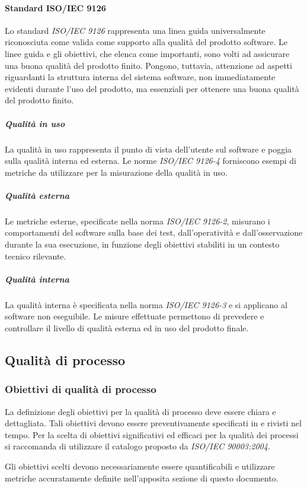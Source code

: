 \documentclass[12pt,a4paper]{article}
\begin{document}
	\paragraph{Standard ISO/IEC 9126}
	Lo standard \textit{ISO/IEC 9126} rappresenta una linea guida universalmente riconosciuta come valida come supporto alla qualità del prodotto software. Le linee guida e gli obiettivi, che elenca come importanti, sono volti ad assicurare una buona qualità del prodotto finito. Pongono, tuttavia, attenzione ad aspetti riguardanti la struttura interna del sistema software, non immediatamente evidenti durante l'uso del prodotto, ma essenziali per ottenere una buona qualità del prodotto finito.
	
	\subparagraph{Qualità in uso}
	La qualità in uso rappresenta il punto di vista dell'utente sul software e poggia sulla qualità interna ed esterna. Le norme \textit{ISO/IEC 9126-4} forniscono esempi di metriche da utilizzare per la misurazione della qualità in uso.
	
	\subparagraph{Qualità esterna}
	Le metriche esterne, specificate nella norma \textit{ISO/IEC 9126-2}, misurano i comportamenti del software sulla base dei test, dall'operatività e dall'osservazione durante la sua esecuzione, in funzione degli obiettivi stabiliti in un contesto tecnico rilevante.
	
	\subparagraph{Qualità interna}
	La qualità interna è specificata nella norma \textit{ISO/IEC 9126-3} e si applicano al software non eseguibile. Le misure effettuate permettono di prevedere e controllare il livello di qualità esterna ed in uso del prodotto finale.
	
	\subsection{Qualità di processo}
	
	\subsubsection{Obiettivi di qualità di processo}
    La definizione degli obiettivi per la qualità di processo deve essere chiara e dettagliata. 
    Tali obiettivi devono essere preventivamente specificati in \NdP{} e rivisti nel tempo. 
    Per la scelta di obiettivi significativi ed efficaci per la qualità dei processi si raccomanda di utilizzare il catalogo proposto da\textit{ ISO/IEC 90003:2004}.
    
    Gli obiettivi scelti devono necessariamente essere quantificabili e utilizzare metriche accuratamente definite nell'apposita sezione di questo documento.    
	
\end{document}
